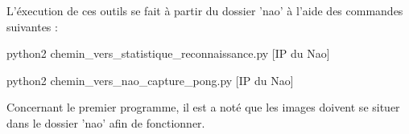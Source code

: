 \par L'éxecution de ces outils se fait à partir du dossier 'nao' à l'aide des commandes suivantes :
\begin{center}
	{python2 chemin_vers_statistique_reconnaissance.py [IP du Nao]}
\end{center}
\begin{center}
	{python2 chemin_vers_nao_capture_pong.py [IP du Nao]}
\end{center}

\par Concernant le premier programme, il est a noté que les images doivent se situer dans le dossier 'nao' afin de 
fonctionner.